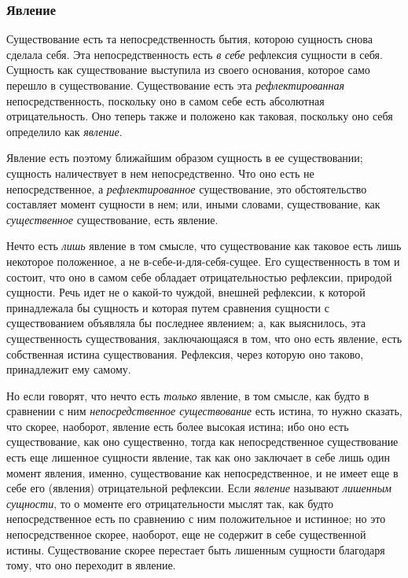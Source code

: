 \subsubsection[Вторая главаЯвление]{\newline
Явление}
\hypertarget{Toc478978745}{}Существование есть та непосредственность бытия,
которою сущность снова сделала себя. Эта непосредственность есть
{\em в себе} рефлексия сущности в себя. Сущность как
существование выступила из своего основания, которое само перешло в
существование. Существование есть эта
{\em рефлектированная} непосредственность, поскольку
оно в самом себе есть абсолютная отрицательность. Оно теперь также и
положено как таковая, поскольку оно себя определило как
{\em явление}.

Явление есть поэтому ближайшим образом сущность в ее существовании; сущность
наличествует в нем непосредственно. Что оно есть не непосредственное, а
{\em рефлектированное} существование, это
обстоятельство составляет момент сущности в нем; или, иными словами,
существование, как {\em существенное} существование,
есть явление.

Нечто есть {\em лишь} явление в том смысле, что
существование как таковое есть лишь некоторое положенное, а не
в-себе-и-для-себя-сущее. Его существенность в том и состоит, что оно в
самом себе обладает отрицательностью рефлексии, природой сущности. Речь
идет не о какой-то чуждой, внешней рефлексии, к которой принадлежала бы
сущность и которая путем сравнения сущности с существованием объявляла бы
последнее явлением; а, как выяснилось, эта существенность существования,
заключающаяся в том, что оно есть явление, есть собственная истина
существования. Рефлексия, через которую оно таково, принадлежит ему самому.

Но если говорят, что нечто есть {\em только} явление, в
том смысле, как будто в сравнении с ним
{\em непосредственное существование} есть истина, то
нужно сказать, что скорее, наоборот, явление есть более высокая истина; ибо
оно есть существование, как оно существенно, тогда как непосредственное
существование есть еще лишенное сущности явление, так как оно заключает в
себе лишь один момент явления, именно, существование как непосредственное,
и не имеет еще в себе его (явления) отрицательной рефлексии. Если
{\em явление} называют
{\em лишенным сущности}, то о моменте его
отрицательности мыслят так, как будто непосредственное есть по сравнению с
ним положительное и истинное; но это непосредственное скорее, наоборот, еще
не содержит в себе существенной истины. Существование скорее перестает быть
лишенным сущности благодаря тому, что оно переходит в явление.

